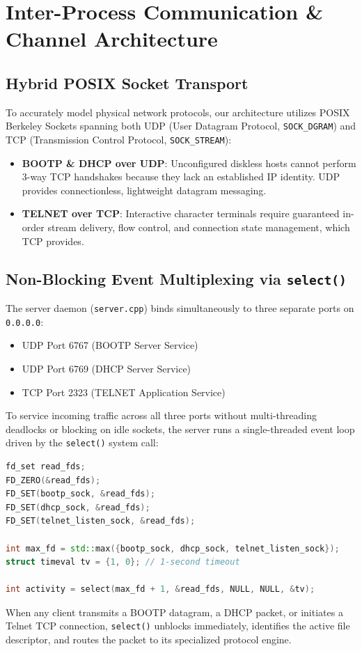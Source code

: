 \documentclass[12pt, a4paper]{article}
\begin{document}
\section{Inter-Process Communication \& Channel Architecture}

\subsection{Hybrid POSIX Socket Transport}
To accurately model physical network protocols, our architecture utilizes POSIX Berkeley Sockets spanning both UDP (User Datagram Protocol, \texttt{SOCK\_DGRAM}) and TCP (Transmission Control Protocol, \texttt{SOCK\_STREAM}):
\begin{itemize}
    \item \textbf{BOOTP \& DHCP over UDP}: Unconfigured diskless hosts cannot perform 3-way TCP handshakes because they lack an established IP identity. UDP provides connectionless, lightweight datagram messaging.
    \item \textbf{TELNET over TCP}: Interactive character terminals require guaranteed in-order stream delivery, flow control, and connection state management, which TCP provides.
\end{itemize}

\subsection{Non-Blocking Event Multiplexing via \texttt{select()}}
The server daemon (\texttt{server.cpp}) binds simultaneously to three separate ports on \texttt{0.0.0.0}:
\begin{itemize}
    \item UDP Port 6767 (BOOTP Server Service)
    \item UDP Port 6769 (DHCP Server Service)
    \item TCP Port 2323 (TELNET Application Service)
\end{itemize}
To service incoming traffic across all three ports without multi-threading deadlocks or blocking on idle sockets, the server runs a single-threaded event loop driven by the \texttt{select()} system call:
\begin{lstlisting}[language=C++]
fd_set read_fds;
FD_ZERO(&read_fds);
FD_SET(bootp_sock, &read_fds);
FD_SET(dhcp_sock, &read_fds);
FD_SET(telnet_listen_sock, &read_fds);

int max_fd = std::max({bootp_sock, dhcp_sock, telnet_listen_sock});
struct timeval tv = {1, 0}; // 1-second timeout

int activity = select(max_fd + 1, &read_fds, NULL, NULL, &tv);
\end{lstlisting}
When any client transmits a BOOTP datagram, a DHCP packet, or initiates a Telnet TCP connection, \texttt{select()} unblocks immediately, identifies the active file descriptor, and routes the packet to its specialized protocol engine.
\end{document}
